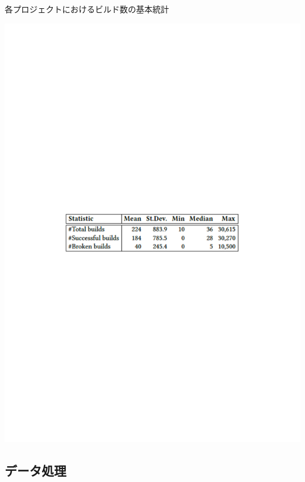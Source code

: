 \begin{table}[t]
    \centering
    \caption{各プロジェクトにおけるビルド数の基本統計}
    \includegraphics[width=0.9\linewidth, angle=0]{./thesis3/docker-build-data3.pdf}
    \label{fig:3_docker-build-data}
\end{table}

\subsection{データ処理}

